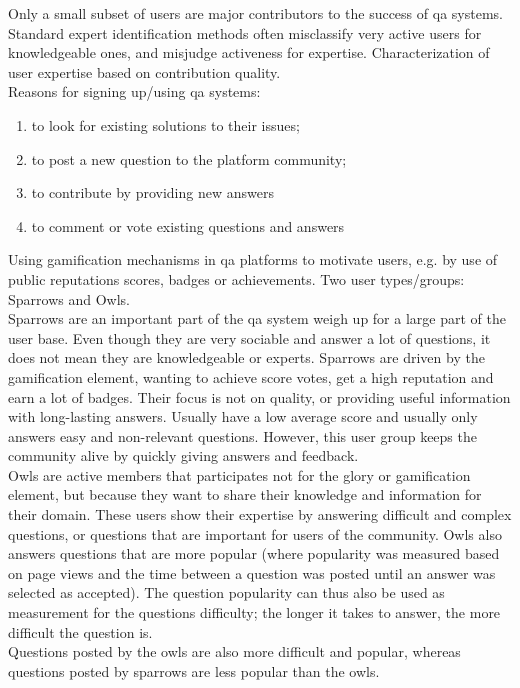 Only a small subset of users are major contributors to the success of \gls{qa} systems. 
Standard expert identification methods often misclassify very active users for knowledgeable ones, and misjudge activeness for expertise. 
Characterization of user expertise based on contribution quality.  \\
Reasons for signing up/using qa systems:  \\
\begin{enumerate}
	\item to look for existing solutions to their issues;
	\item to post a new question to the platform community;
	\item to contribute by providing new answers
	\item to comment or vote existing questions and answers
\end{enumerate}
Using gamification mechanisms in \gls{qa} platforms to motivate users, e.g. by use of public reputations scores, badges or achievements. 
Two user types/groups: Sparrows and Owls. \\
Sparrows are an important part of the \gls{qa} system weigh up for a large part of the user base. 
Even though they are very sociable and answer a lot of questions, it does not mean they are knowledgeable or experts.
Sparrows are driven by the gamification element, wanting to achieve score votes, get a high reputation and earn a lot of badges. 
Their focus is not on quality, or providing useful information with long-lasting answers. Usually have a low average score and usually only answers easy and non-relevant questions. 
However, this user group keeps the community alive by quickly giving answers and feedback.  \\
Owls are active members that participates not for the glory or gamification element, but because they want to share their knowledge and information for their domain. 
These users show their expertise by answering difficult and complex questions, or questions that are important for users of the community. 
Owls also answers questions that are more popular (where popularity was measured based on page views and the time between a question was posted until an answer was selected as accepted).
The question popularity can thus also be used as measurement for the questions difficulty; the longer it takes to answer, the more difficult the question is. \\
Questions posted by the owls are also more difficult and popular, whereas questions posted by sparrows are less popular than the owls. 
